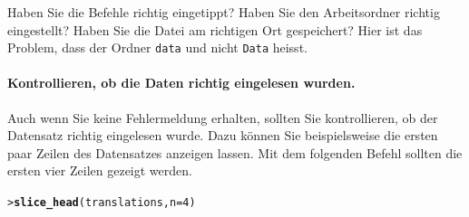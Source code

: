 \documentclass[oneside, 10pt]{book}\usepackage[]{graphicx}\usepackage[]{xcolor}
\makeatletter
\newcommand{\hlnum}[1]{\textcolor[rgb]{0.686,0.059,0.569}{#1}}%
\newcommand{\hlstd}[1]{\textcolor[rgb]{0.345,0.345,0.345}{#1}}%
\newcommand{\hlkwc}[1]{\textcolor[rgb]{0.333,0.667,0.333}{#1}}%
\newcommand{\hlkwd}[1]{\textcolor[rgb]{0.737,0.353,0.396}{\textbf{#1}}}%
\newenvironment{kframe}{%
 \def\at@end@of@kframe{}%
 \ifinner\ifhmode%
  \def\at@end@of@kframe{\end{minipage}}%
  \begin{minipage}{\columnwidth}%
 \fi\fi%
 \def\FrameCommand##1{\hskip\@totalleftmargin \hskip-\fboxsep
 \colorbox{shadecolor}{##1}\hskip-\fboxsep
     \hskip-\linewidth \hskip-\@totalleftmargin \hskip\columnwidth}%
 \MakeFramed {\advance\hsize-\width
   \@totalleftmargin\z@ \linewidth\hsize
   \@setminipage}}%
 {\par\unskip\endMakeFramed%
 \at@end@of@kframe}
\newenvironment{knitrout}{}{} %
\makeatother
\begin{document}
Haben Sie die Befehle richtig eingetippt? Haben Sie den
Arbeitsordner richtig eingestellt? Haben Sie die Datei am richtigen
Ort gespeichert? Hier ist das Problem, dass der Ordner \texttt{data} und nicht \texttt{Data} heisst.

\paragraph{Kontrollieren, ob die Daten richtig eingelesen wurden.}
Auch wenn Sie keine Fehlermeldung erhalten, sollten Sie kontrollieren,
ob der Datensatz richtig eingelesen wurde. Dazu können Sie 
beispielsweise die ersten paar Zeilen des Datensatzes anzeigen
lassen. Mit dem folgenden Befehl sollten die ersten vier Zeilen
gezeigt werden.
\begin{knitrout}
\color{fgcolor}\begin{kframe}
\begin{alltt}
\hlstd{> }\hlkwd{slice_head}\hlstd{(translations,} \hlkwc{n} \hlstd{=} \hlnum{4}\hlstd{)}
\end{alltt}


{\ttfamily\noindent\bfseries{}}\end{kframe}
\end{knitrout}
\end{document}
